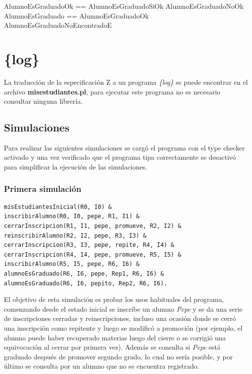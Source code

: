 \documentclass{article}
\begin{document}
\begin{zed}
    AlumnoEsGraduadoOk == AlumnoEsGraduadoSiOk \lor AlumnoEsGraduadoNoOk \\
    AlumnoEsGraduado == AlumnoEsGraduadoOk \lor AlumnoEsGraduadoNoEncontradoE \\
\end{zed}



\section{\{log\}}
La traducción de la especificación Z a un programa \emph{\{log\}} se puede encontrar en el archivo \textbf{misestudiantes.pl}, para ejecutar este programa no es necesario consultar ninguna librería.

\subsection{Simulaciones}
Para realizar las siguientes simulaciones se cargó el programa con el type checker activado y una vez verificado que el programa tipa correctamente se desactivó para simplificar la ejecución de las simulaciones.

\subsubsection*{Primera simulación}
\begin{verbatim}
misEstudiantesInicial(R0, I0) & 
inscribirAlumno(R0, I0, pepe, R1, I1) & 
cerrarInscripcion(R1, I1, pepe, promueve, R2, I2) & 
reinscribirAlumno(R2, I2, pepe, R3, I3) & 
cerrarInscripcion(R3, I3, pepe, repite, R4, I4) & 
cerrarInscripcion(R4, I4, pepe, promueve, R5, I5) & 
inscribirAlumno(R5, I5, pepe, R6, I6) & 
alumnoEsGraduado(R6, I6, pepe, Rep1, R6, I6) & 
alumnoEsGraduado(R6, I6, pepito, Rep2, R6, I6).
\end{verbatim}

El objetivo de esta simulación es probar los usos habituales del programa, comenzando desde el estado inicial se inscribe un alumno \emph{Pepe} y se da una serie de inscripciones cerradas y reinscripciones, incluso una ocasión donde se cerró una inscripción como repitente y luego se modificó a promoción (por ejemplo, el alumno puede haber recuperado materias luego del cierre o se corrigió una equivocación al cerrar por primera vez). Además se consulta si \emph{Pepe} está graduado después de promover segundo grado, lo cual no sería posible, y por último se consulta por un alumno que no se encuentra registrado.
\end{document}
